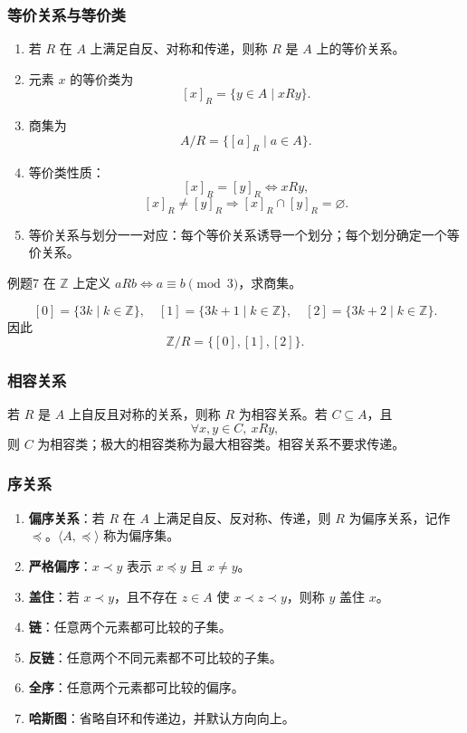 \subsubsection{等价关系与等价类}

\begin{enumerate}
	\item 若 \(R\) 在 \(A\) 上满足自反、对称和传递，则称 \(R\) 是 \(A\) 上的等价关系。
	\item 元素 \(x\) 的等价类为
	\[
	[x]_R=\{y\in A\mid xRy\}.
	\]
	\item 商集为
	\[
	A/R=\{[a]_R\mid a\in A\}.
	\]
	\item 等价类性质：
	\[
	[x]_R=[y]_R\Leftrightarrow xRy,
	\]
	\[
	[x]_R\ne[y]_R\Rightarrow [x]_R\cap[y]_R=\varnothing.
	\]
	\item 等价关系与划分一一对应：每个等价关系诱导一个划分；每个划分确定一个等价关系。
\end{enumerate}

\begin{question}{例题7}
	在 \(\mathbb{Z}\) 上定义 \(aRb\Leftrightarrow a\equiv b\pmod 3\)，求商集。
	
	\begin{solution}
	\[
	[0]=\{3k\mid k\in\mathbb{Z}\},\quad
	[1]=\{3k+1\mid k\in\mathbb{Z}\},\quad
	[2]=\{3k+2\mid k\in\mathbb{Z}\}.
	\]
	因此
	\[
	\mathbb{Z}/R=\{[0],[1],[2]\}.
	\]
	\end{solution}
\end{question}

\subsubsection{相容关系}

若 \(R\) 是 \(A\) 上自反且对称的关系，则称 \(R\) 为相容关系。若 \(C\subseteq A\)，且
\[
\forall x,y\in C,\ xRy,
\]
则 \(C\) 为相容类；极大的相容类称为最大相容类。相容关系不要求传递。

\subsubsection{序关系}

\begin{enumerate}
	\item \textbf{偏序关系}：若 \(R\) 在 \(A\) 上满足自反、反对称、传递，则 \(R\) 为偏序关系，记作 \(\preceq\)。\(\langle A,\preceq\rangle\) 称为偏序集。
	\item \textbf{严格偏序}：\(x\prec y\) 表示 \(x\preceq y\) 且 \(x\ne y\)。
	\item \textbf{盖住}：若 \(x\prec y\)，且不存在 \(z\in A\) 使 \(x\prec z\prec y\)，则称 \(y\) 盖住 \(x\)。
	\item \textbf{链}：任意两个元素都可比较的子集。
	\item \textbf{反链}：任意两个不同元素都不可比较的子集。
	\item \textbf{全序}：任意两个元素都可比较的偏序。
	\item \textbf{哈斯图}：省略自环和传递边，并默认方向向上。
\end{enumerate}

